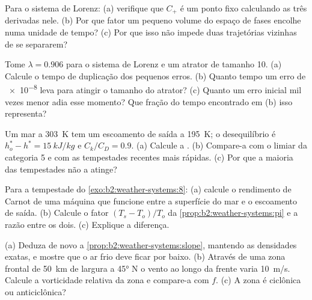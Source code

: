 \begin{exercise}[$\star\star$]\label{exo:b2:weather-systems:6}
Para o sistema de Lorenz: (a) verifique que $C_+$ é um ponto fixo calculando as três derivadas
nele. (b) Por que fator um pequeno volume do espaço de fases encolhe numa unidade de tempo? (c) Por que
isso não impede duas trajetórias vizinhas de se separarem?
\end{exercise}

\begin{exercise}[$\star\star$]\label{exo:b2:weather-systems:7}
Tome $\lambda = 0.906$ para o sistema de Lorenz e um atrator de tamanho 10. (a) Calcule o
tempo de duplicação dos pequenos erros. (b) Quanto tempo um erro de \num{e-8} leva para atingir o tamanho do
atrator? (c) Quanto um erro inicial mil vezes menor adia esse momento? Que
fração do tempo encontrado em (b) isso representa?
\end{exercise}

\begin{exercise}[$\star\star$]\label{exo:b2:weather-systems:8}
Um mar a \qty{303}{K} tem um escoamento de saída a \qty{195}{K}; o desequilíbrio é $h_o^* - h^* =
\qty{15}{kJ/kg}$ e $C_k/C_D = 0.9$. (a) Calcule a . (b) Compare-a com
o limiar da categoria 5 e com as tempestades recentes mais rápidas. (c) Por que a maioria das tempestades não a
atinge?
\end{exercise}

\begin{exercise}[$\star\star$]\label{exo:b2:weather-systems:9}
Para a tempestade do \cref{exo:b2:weather-systems:8}: (a) calcule o rendimento de Carnot de uma máquina
que funcione entre a superfície do mar e o escoamento de saída. (b) Calcule o fator $(T_s - T_o)/T_o$ da
\cref{prop:b2:weather-systems:pi} e a razão entre os dois. (c) Explique a diferença.
\end{exercise}

\begin{exercise}[$\star\star\star$]\label{exo:b2:weather-systems:10}
(a) Deduza de novo a \cref{prop:b2:weather-systems:slope}, mantendo as densidades exatas, e mostre que
o ar frio deve ficar por baixo. (b) Através de uma zona frontal de \qty{50}{km} de largura a \ang{45} N o vento
ao longo da frente varia \qty{10}{m/s}. Calcule a vorticidade relativa da zona e compare-a
com $f$. (c) A zona é ciclônica ou anticiclônica?
\end{exercise}

